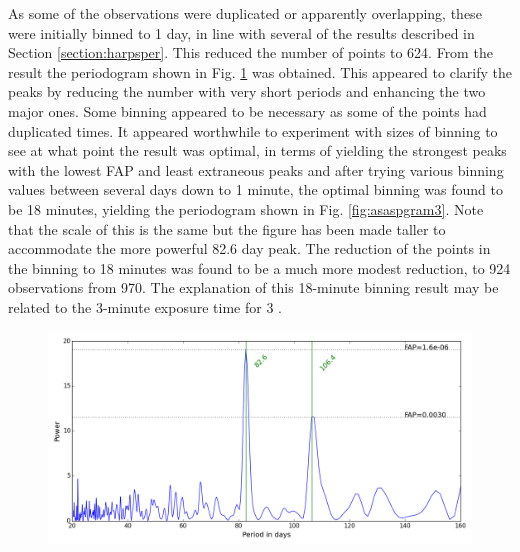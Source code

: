 As some of the observations were duplicated or apparently overlapping, these were initially binned to 1 day, in line
with several of the {\harps} results described in Section \ref{section:harpsper}. This reduced the number of points to
624. From the result the periodogram shown in Fig. \ref{fig:asaspgram2} was obtained. This appeared to clarify the peaks
by reducing the number with very short periods and enhancing the two major ones. Some binning appeared to be necessary
as some of the points had duplicated times. It appeared worthwhile to experiment with sizes of binning to see at what
point the result was optimal, in terms of yielding the strongest peaks with the lowest FAP and least extraneous peaks
and after trying various binning values between several days down to 1 minute, the optimal binning was found to be 18
minutes, yielding the periodogram shown in Fig. \ref{fig:asaspgram3}. Note that the scale of this is the same but the
figure has been made taller to accommodate the more powerful 82.6 day peak. The reduction of the points in the binning
to 18 minutes was found to be a much more modest reduction, to 924 observations from 970. The explanation of this
18-minute binning result may be related to the 3-minute exposure time for {\asas} 3 \citep{pojmanski01}.

\begin{figure}[!htbp]
\begin{center}
\includegraphics[scale=0.50]{Figures/asasbin1.png} \\
\end{center}
\caption{}
\protect\label{fig:asaspgram2}
\end{figure}

